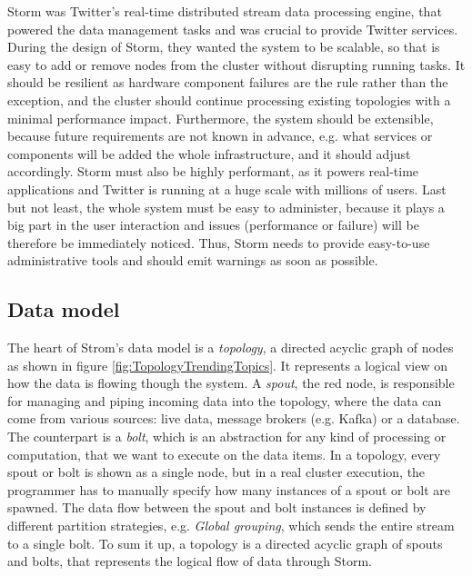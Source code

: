 \documentclass[conference]{IEEEtran}
\begin{document}
Storm was Twitter's real-time distributed stream data processing engine, that powered the data management tasks and was crucial to provide Twitter services.
During the design of Storm, they wanted the system to be scalable, so that is easy to add or remove nodes from the cluster without disrupting running tasks.
It should be resilient as hardware component failures are the rule rather than the exception, and the cluster should continue processing existing topologies with a minimal performance impact.
Furthermore, the system should be extensible, because future requirements are not known in advance, e.g. what services or components will be added the whole infrastructure, and it should adjust accordingly.
Storm must also be highly performant, as it powers real-time applications and Twitter is running at a huge scale with millions of users.
Last but not least, the whole system must be easy to administer, because it plays a big part in the user interaction and issues (performance or failure) will be therefore be immediately noticed.
Thus, Storm needs to provide easy-to-use administrative tools and should emit warnings as soon as possible.

\subsection{Data model}

The heart of Strom's data model is a \emph{topology}, a directed acyclic graph of nodes as shown in figure \ref{fig:TopologyTrendingTopics}.
It represents a logical view on how the data is flowing though the system.
A \emph{spout}, the red node, is responsible for managing and piping incoming data into the topology, where the data can come from various sources: live data, message brokers (e.g. Kafka)  or a database.
The counterpart is a \emph{bolt}, which is an abstraction for any kind of processing or computation, that we want to execute on the data items.
In a topology, every spout or bolt is shown as a single node, but in a real cluster execution, the programmer has to manually specify how many instances of a spout or bolt are spawned.
The data flow between the spout and bolt instances is defined by different partition strategies, e.g. \emph{Global grouping}, which sends the entire stream to a single bolt.
To sum it up, a topology is a directed acyclic graph of spouts and bolts, that represents the logical flow of data through Storm.
\end{document}
